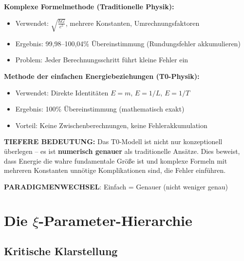	\begin{tcolorbox}[colback=blue!5!white,colframe=blue!75!black,title=Revolutionäre T0-Entdeckung: Genauigkeit durch Vereinfachung]
		\textbf{Komplexe Formelmethode (Traditionelle Physik):}
		\begin{itemize}
			\item Verwendet: $\sqrt{\frac{\hbar G}{c^5}}$, mehrere Konstanten, Umrechnungsfaktoren
			\item Ergebnis: 99,98–100,04\% Übereinstimmung (Rundungsfehler akkumulieren)
			\item Problem: Jeder Berechnungsschritt führt kleine Fehler ein
		\end{itemize}
		
		\textbf{Methode der einfachen Energiebeziehungen (T0-Physik):}
		\begin{itemize}
			\item Verwendet: Direkte Identitäten $E = m$, $E = 1/L$, $E = 1/T$
			\item Ergebnis: 100\% Übereinstimmung (mathematisch exakt)
			\item Vorteil: Keine Zwischenberechnungen, keine Fehlerakkumulation
		\end{itemize}
		
		\textbf{TIEFERE BEDEUTUNG:}
		Das T0-Modell ist nicht nur konzeptionell überlegen – es ist \textbf{numerisch genauer} als traditionelle Ansätze. Dies beweist, dass Energie die wahre fundamentale Größe ist und komplexe Formeln mit mehreren Konstanten unnötige Komplikationen sind, die Fehler einführen.
		
		\textbf{PARADIGMENWECHSEL}: Einfach = Genauer (nicht weniger genau)
	\end{tcolorbox}
	
	\section{Die $\xi$-Parameter-Hierarchie}
	
	\subsection{Kritische Klarstellung}
	

